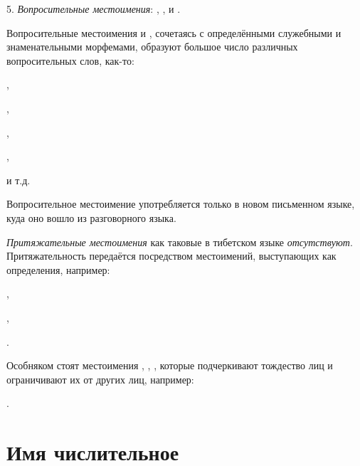 5. \emph{Вопросительные местоимения}:
, ,  и .

Вопросительные местоимения  и , сочетаясь с определёнными служебными и знаменательными морфемами, образуют большое число различных вопросительных слов, как-то:
\begin{prfsample}
    \item {},
    \item {},
    \item {},
    \item {},
    \item {}
\end{prfsample}
и т.д.

Вопросительное местоимение  употребляется только в новом письменном языке, куда оно вошло из разговорного языка.

\emph{Притяжательные местоимения} как таковые в тибетском языке \emph{отсутствуют}. Притяжательность передаётся посредством местоимений, выступающих как определения, например:
\begin{prfsample}
    \item {},
    \item {},
    \item {}.
\end{prfsample}

Особняком стоят местоимения , , , которые подчеркивают тождество лиц и ограничивают их от других лиц, например:
\begin{prfsample}
    \item {}.    
\end{prfsample}

\section{Имя числительное}

